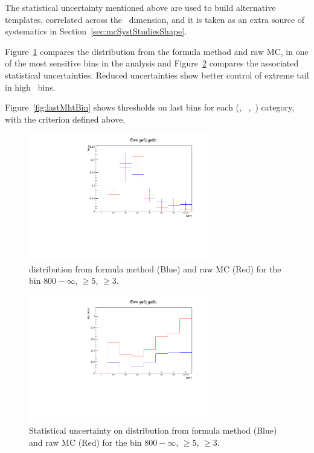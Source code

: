 The statistical uncertainty mentioned above are used to 
build alternative \mht templates, correlated across the \nb~dimension, 
and it is taken as an extra source of systematics in Section~\ref{sec:mcSystStudiesShape}.

Figure~\ref{fig:mhtShape_Ewk_ge5j_ge3b_ht800} compares the \mht distribution from
the formula method and raw MC, in one of the most sensitive bins in the analysis and Figure~\ref{fig:mhtShapeErr_Ewk_ge5j_ge3b_ht800} compares the associated 
 statistical uncertainties. Reduced uncertainties show better control 
  of extreme \mht tail in high \nb~bins.

Figure~\ref{fig:lastMhtBin} shows thresholds on last \mht bins for each (\njet,
~\nb,~\scalht) category, with the criterion defined above.


\begin{figure}[h!]
  \centering
  \includegraphics[width=0.7\textwidth]{figures/btagformula/GoodMHTShape_ge5j_ge3b.pdf} 
  \caption{\label{fig:mhtShape_Ewk_ge5j_ge3b_ht800} \mht distribution from formula
   method (Blue) and raw MC (Red) for the bin \scalht $800-\infty$, \njet $\geq 5$, \nb $\geq 3$.}
\end{figure}

\begin{figure}[h!]
  \centering
  \includegraphics[width=0.7\textwidth]{figures/btagformula/GoodMHTShapeErr_ge5j_ge3b.pdf} 
  \caption{\label{fig:mhtShapeErr_Ewk_ge5j_ge3b_ht800} Statistical uncertainty on \mht 
  distribution from formula method (Blue) and raw MC (Red) for the bin
  \scalht $800-\infty$, \njet $\geq 5$, \nb $\geq 3$.}
\end{figure}

